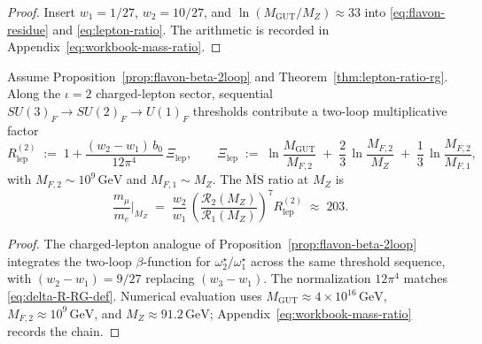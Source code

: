 \begin{proof}
Insert $w_1=1/27$, $w_2=10/27$, and
$\ln(M_{\mathrm{GUT}}/M_Z)\approx33$ into \eqref{eq:flavon-residue} and
\eqref{eq:lepton-ratio}. The arithmetic is recorded in
Appendix~\eqref{eq:workbook-mass-ratio}.
\end{proof}

\begin{proposition}\label{prop:lepton-ratio-2loop}
Assume Proposition~\ref{prop:flavon-beta-2loop} and Theorem~\ref{thm:lepton-ratio-rg}.
Along the $\iota=2$ charged-lepton sector, sequential $SU(3)_F\to SU(2)_F\to
U(1)_F$ thresholds contribute a two-loop multiplicative factor
\begin{equation}\label{eq:lepton-R2}
  R_{\mathrm{lep}}^{(2)}
  \;:=\;
  1 + \frac{(w_2-w_1)\,b_0}{12\pi^4}\,\Xi_{\mathrm{lep}},
  \qquad
  \Xi_{\mathrm{lep}}
  \;:=\;
  \ln\!\frac{M_{\mathrm{GUT}}}{M_{F,2}}
  \;+\;
  \frac{2}{3}\,\ln\!\frac{M_{F,2}}{M_Z}
  \;+\;
  \frac{1}{3}\,\ln\!\frac{M_{F,2}}{M_{F,1}},
\end{equation}
with $M_{F,2}\sim10^{9}\,\mathrm{GeV}$ and $M_{F,1}\sim M_Z$. The
$\overline{\mathrm{MS}}$ ratio at $M_Z$ is
\begin{equation}\label{eq:lepton-ratio-2loop}
  \frac{m_\mu}{m_e}\Big|_{M_Z}
  \;=\;
  \frac{w_2}{w_1}\,
  \left(
    \frac{\mathcal{R}_2(M_Z)}{\mathcal{R}_1(M_Z)}
  \right)^{\!7}
  R_{\mathrm{lep}}^{(2)}
  \;\approx\;
  203.
\end{equation}
\end{proposition}

\begin{proof}
The charged-lepton analogue of Proposition~\ref{prop:flavon-beta-2loop}
integrates the two-loop $\beta$-function for $\omega^\star_2/\omega^\star_1$
across the same threshold sequence, with $(w_2-w_1)=9/27$ replacing
$(w_3-w_1)$. The normalization $12\pi^4$ matches
\eqref{eq:delta-R-RG-def}. Numerical evaluation uses
$M_{\mathrm{GUT}}\approx4\times10^{16}\,\mathrm{GeV}$,
$M_{F,2}\approx10^{9}\,\mathrm{GeV}$, and $M_Z\approx91.2\,\mathrm{GeV}$;
Appendix~\eqref{eq:workbook-mass-ratio} records the chain.
\end{proof}

